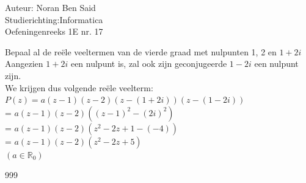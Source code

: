 \documentclass[a4paper]{article}
\begin{document}
  
\noindent \large Auteur: Noran Ben Said \\
\noindent \large Studierichting:Informatica\\
\noindent \large Oefeningenreeks 1E nr. 17\\

\medskip

\normalsize

Bepaal al de reële veeltermen van de vierde graad met nulpunten 1, 2 en $1+2i$\\

Aangezien $1+2i$ een nulpunt is, zal ook zijn geconjugeerde $1-2i$ een nulpunt zijn.\\

We krijgen dus volgende reële veelterm:\\

$P(z)=a(z-1)(z-2)(z-(1+2i))(z-(1-2i))$\\

= $a(z-1)(z-2)((z-1)^2-(2i)^2)$\\

= $a(z-1)(z-2)(z^2-2z+1-(-4))$\\

= $a(z-1)(z-2)(z^2-2z+5)$\\

$(a \in\mathbb{R}_0)$




\begin{thebibliography}{999}
\end{thebibliography}
\end{document}
